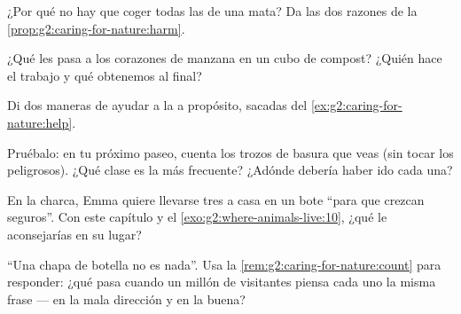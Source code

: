 \begin{exercise}[$\star$]\label{exo:g2:caring-for-nature:5}
¿Por qué no hay que coger todas las  de una mata? Da las dos
razones de la \cref{prop:g2:caring-for-nature:harm}.
\end{exercise}

\begin{exercise}[$\star$]\label{exo:g2:caring-for-nature:6}
¿Qué les pasa a los corazones de manzana en un cubo de compost? ¿Quién
hace el trabajo y qué obtenemos al final?
\end{exercise}

\begin{exercise}[$\star$]\label{exo:g2:caring-for-nature:7}
Di dos maneras de ayudar a la  a propósito, sacadas del
\cref{ex:g2:caring-for-nature:help}.
\end{exercise}

\begin{exercise}[$\star$]\label{exo:g2:caring-for-nature:8}
Pruébalo: en tu próximo paseo, cuenta los trozos de basura que veas
(sin tocar los peligrosos). ¿Qué clase es la más frecuente? ¿Adónde
debería haber ido cada una?
\end{exercise}

\begin{exercise}[$\star\star$]\label{exo:g2:caring-for-nature:9}
En la charca, Emma quiere llevarse tres  a casa en un bote
``para que crezcan seguros''. Con este capítulo y el
\cref{exo:g2:where-animals-live:10}, ¿qué le aconsejarías en su lugar?
\end{exercise}

\begin{exercise}[$\star\star$]\label{exo:g2:caring-for-nature:10}
``Una chapa de botella no es nada''. Usa la
\cref{rem:g2:caring-for-nature:count} para responder: ¿qué pasa cuando
un millón de visitantes piensa cada uno la misma frase --- en la mala
dirección y en la buena?
\end{exercise}
